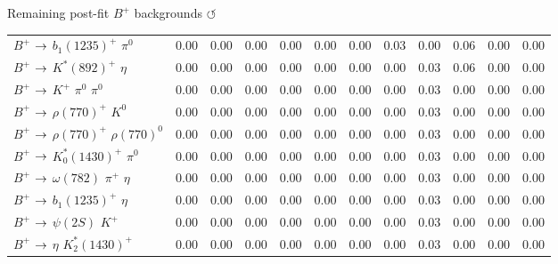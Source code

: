 \documentclass[xcolor=dvipsnames]{beamer}
\begin{document}
\begin{frame}{Remaining post-fit $B^+$ backgrounds \hyperlink{frame:A}{$\circlearrowleft$}}
{\begin{tabular}{lrrrrrrrrrrr}
      $B^{+}$ $\rightarrow$ $b_{1}(1235)^{+}$ $\pi^{0}$                            &         0.00 &         0.00 &         0.00 &         0.00 &         0.00 &         0.00 &         0.03 &         0.00 &         0.06 &         0.00 &         0.00 \\
      $B^{+}$ $\rightarrow$ $K^{*}(892)^{+}$ $\eta$                                &         0.00 &         0.00 &         0.00 &         0.00 &         0.00 &         0.00 &         0.00 &         0.03 &         0.06 &         0.00 &         0.00 \\
      $B^{+}$ $\rightarrow$ $K^{+}$ $\pi^{0}$ $\pi^{0}$                            &         0.00 &         0.00 &         0.00 &         0.00 &         0.00 &         0.00 &         0.00 &         0.03 &         0.00 &         0.00 &         0.00 \\
      $B^{+}$ $\rightarrow$ $\rho(770)^{+}$ $K^{0}$                                &         0.00 &         0.00 &         0.00 &         0.00 &         0.00 &         0.00 &         0.00 &         0.03 &         0.00 &         0.00 &         0.00 \\
      $B^{+}$ $\rightarrow$ $\rho(770)^{+}$ $\rho(770)^{0}$                        &         0.00 &         0.00 &         0.00 &         0.00 &         0.00 &         0.00 &         0.00 &         0.03 &         0.00 &         0.00 &         0.00 \\
      $B^{+}$ $\rightarrow$ $K_{0}^{*}(1430)^{+}$ $\pi^{0}$                        &         0.00 &         0.00 &         0.00 &         0.00 &         0.00 &         0.00 &         0.00 &         0.03 &         0.00 &         0.00 &         0.00 \\
      $B^{+}$ $\rightarrow$ $\omega(782)$ $\pi^{+}$ $\eta$                         &         0.00 &         0.00 &         0.00 &         0.00 &         0.00 &         0.00 &         0.00 &         0.03 &         0.00 &         0.00 &         0.00 \\
      $B^{+}$ $\rightarrow$ $b_{1}(1235)^{+}$ $\eta$                               &         0.00 &         0.00 &         0.00 &         0.00 &         0.00 &         0.00 &         0.00 &         0.03 &         0.00 &         0.00 &         0.00 \\
      $B^{+}$ $\rightarrow$ $\psi(2S)$ $K^{+}$                                     &         0.00 &         0.00 &         0.00 &         0.00 &         0.00 &         0.00 &         0.00 &         0.03 &         0.00 &         0.00 &         0.00 \\
      $B^{+}$ $\rightarrow$ $\eta$ $K_{2}^{*}(1430)^{+}$                           &         0.00 &         0.00 &         0.00 &         0.00 &         0.00 &         0.00 &         0.00 &         0.03 &         0.00 &         0.00 &         0.00 \\

\end{tabular}}
\end{frame}
\end{document}
